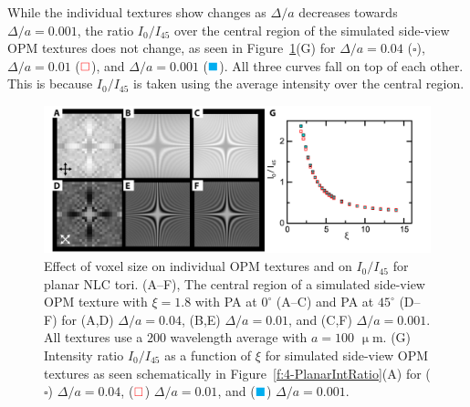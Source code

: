 While the individual textures show changes as $\Delta /a$ decreases towards $\Delta /a = 0.001$, the ratio $I_0/I_{45}$ over the central region of the simulated side-view OPM textures does not change, as seen in Figure~\ref{f:4-PlanarVoxel}(G) for $\Delta /a = 0.04$ ($\square$), $\Delta /a = 0.01$ (${\color{red}\square}$), and $\Delta /a = 0.001$ (${\color{cyan}\blacksquare}$).
All three curves fall on top of each other.
This is because $I_0/I_{45}$ is taken using the average intensity over the central region.
\begin{figure}
\centering
\includegraphics{figures/C4/Ch4-Figs_SimDeltaTest.png}
\caption{Effect of voxel size on individual OPM textures and on $I_0/I_{45}$ for planar NLC tori.
(A--F), The central region of a simulated side-view OPM texture with $\xi = 1.8$ with PA at $0^{\circ}$ (A--C) and PA at $45^{\circ}$ (D--F) for (A,D) $\Delta /a = 0.04$, (B,E) $\Delta /a = 0.01$, and (C,F) $\Delta /a = 0.001$.
All textures use a $200$ wavelength average with $a = 100$ $\upmu$m.
(G) Intensity ratio $I_0/I_{45}$ as a function of $\xi$ for simulated side-view OPM textures as seen schematically in Figure~\ref{f:4-PlanarIntRatio}(A) for ($\square$) $\Delta /a = 0.04$, (${\color{red}\square}$) $\Delta /a = 0.01$, and (${\color{cyan}\blacksquare}$) $\Delta /a = 0.001$.
}\label{f:4-PlanarVoxel}
\end{figure}

